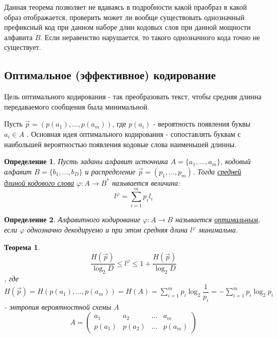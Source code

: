 \documentclass[14pt,a4paper,russian]{article}
\newtheorem{opr}{Определение}[section]
\newtheorem{teor}{Теорема}[section]
\begin{document}
Данная теорема позволяет не вдаваясь в подробности какой праобраз в какой образ отображается, проверить может ли вообще существовать однозначный префиксный код при данном наборе длин кодовых слов при данной мощности алфавита $B$. Если неравенство нарушается, то такого однозначного кода точно не существует.
\subsection{Оптимальное (эффективное) кодирование}
Цель оптимального кодирования - так преобразовать текст, чтобы средняя длинна передаваемого сообщения была минимальной.

Пусть $\vec{p} = (p(a_1), \ldots, p(a_m))$, где $p(a_i)$ - вероятность появления буквы $a_i \in A$ . Основная идея оптимального кодирования - сопоставлять буквам с наибольшей вероятностью появления кодовые слова наименьшей длинны.

\begin{opr}
	Пусть заданы алфавит источника $A = \{a_1, \ldots, a_m \}$, кодовый алфавит $B = \{b_1,\ldots, b_D \}$ и распределение $\vec{p} = (p_1, \ldots, p_m)$. Тогда \uline{средней длиной кодового слова} $\varphi \colon A \rightarrow B^*$ называется величина:
	\begin{equation}
		l^\varphi = \sum\limits_{i=1}^m p_i l_i
	\end{equation}
\end{opr}
\begin{opr}
	Алфавитного кодирование $\varphi \colon A \rightarrow B$ называется \uline{оптимальным}, если $\varphi$ однозначно декодируемо и при этом средняя длина $l^\varphi$ минимальна.
\end{opr}
\begin{teor}
	\begin{equation}
		\dfrac{H(\vec{p})}{\log_2 D} \le l^\varphi \le 1 + \dfrac{H(\vec{p})}{\log_2 D}
	\end{equation}
	, где $H(\vec{p}) = H(p(a_1), \ldots, p(a_m)) = H(A) =\sum\limits_{i=1}^m p_i \log_2 \dfrac{1}{p_i}= -\sum\limits_{i=1}^m p_i \log_2 p_i$ - энтропия вероятностной схемы $A$
	$$ A =\begin{pmatrix}
		a_1    & a_2    & \ldots & a_m    \\
		p(a_1) & p(a_2) & \ldots & p(a_m)
	\end{pmatrix}$$ 
\end{teor}
\end{document}
